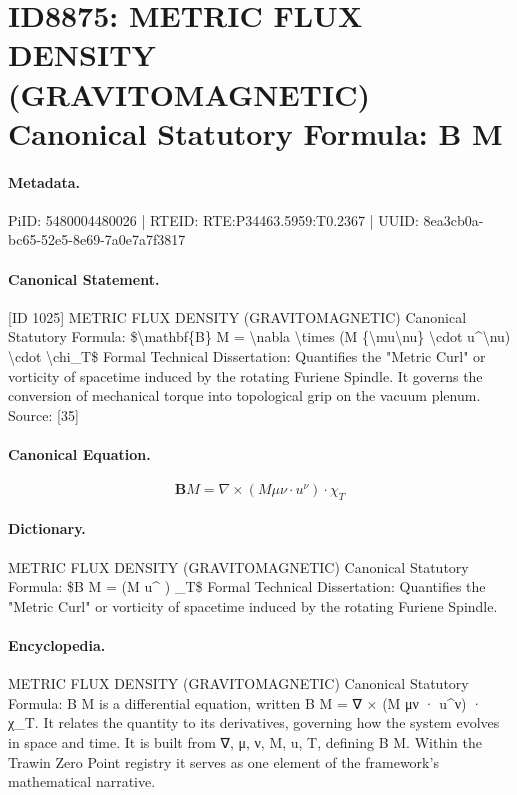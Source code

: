 \section*{ID8875: METRIC FLUX DENSITY (GRAVITOMAGNETIC) Canonical Statutory Formula: B M}
\paragraph{Metadata.}
PiID: 5480004480026 | RTEID: RTE:P34463.5959:T0.2367 | UUID: 8ea3cb0a-bc65-52e5-8e69-7a0e7a7f3817

\paragraph{Canonical Statement.}
[ID 1025] METRIC FLUX DENSITY (GRAVITOMAGNETIC) Canonical Statutory Formula: \$\textbackslash{}mathbf\{B\} M = \textbackslash{}nabla \textbackslash{}times (M \{\textbackslash{}mu\textbackslash{}nu\} \textbackslash{}cdot u\textasciicircum{}\textbackslash{}nu) \textbackslash{}cdot \textbackslash{}chi\_T\$ Formal Technical Dissertation: Quantifies the "Metric Curl" or vorticity of spacetime induced by the rotating Furiene Spindle. It governs the conversion of mechanical torque into topological grip on the vacuum plenum. Source: [35]

\paragraph{Canonical Equation.}
\[
\mathbf{B} M = \nabla \times (M {\mu\nu} \cdot u^\nu) \cdot \chi_T
\]

\paragraph{Dictionary.}
METRIC FLUX DENSITY (GRAVITOMAGNETIC) Canonical Statutory Formula: \$B M = (M u\textasciicircum{} ) \_T\$ Formal Technical Dissertation: Quantifies the "Metric Curl" or vorticity of spacetime induced by the rotating Furiene Spindle.

\paragraph{Encyclopedia.}
METRIC FLUX DENSITY (GRAVITOMAGNETIC) Canonical Statutory Formula: B M is a differential equation, written B M = ∇ × (M μν · u\textasciicircum{}ν) · χ\_T. It relates the quantity to its derivatives, governing how the system evolves in space and time. It is built from ∇, μ, ν, M, u, T, defining B M. Within the Trawin Zero Point registry it serves as one element of the framework's mathematical narrative.
